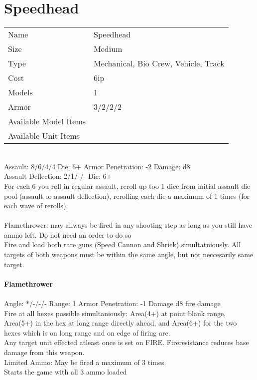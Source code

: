 






\pagebreak

\section{ Speedhead }

\begin{tabular}{ll}
  Name & Speedhead \\
  Size & Medium\\
  Type & Mechanical, Bio Crew, Vehicle, Track\\
  Cost & 6ip\\
  Models & 1\\
  Armor & 3/2/2/2\\
  Available Model Items &  \\
  Available Unit Items &  \\
\end{tabular}

\ \\
Assault: 8/6/4/4 Die: 6+ Armor Penetration: -2 Damage: d8 \\
Assault Deflection: 2/1/-/- Die: 6+\\
\indent For each 6 you roll in regular assault, reroll up too 1 dice from initial assault die pool (assault or assault deflection), rerolling each die a maximum of 1 times (for each wave of rerolls). \\
\ \\
Flamethrower: may allways be fired in any shooting step as long as you still have ammo left. Do not need an order to do so \\ Fire and load both rare guns (Speed Cannon and Shriek) simultatniously. All targets of both weapons must be within the same angle, but not neccesarily same target.
\ \\
\ \\
{\bf Flamethrower } \\
\ \\
Angle: */-/-/- Range: 1 Armor Penetration: -1 Damage d8 fire damage \\
\indent Fire at all hexes possible simultaniously: Area(4+) at point blank range, Area(5+) in the hex at long range directly ahead, and Area(6+) for the two hexes which is on long range and on edge of firing arc. \\ Any target unit effected atleast once is set on FIRE. Fireresistance reduces base damage from this weapon. \\ Limited Ammo: May be fired a maximum of 3 times. \\ Starts the game with all 3 ammo loaded \\



